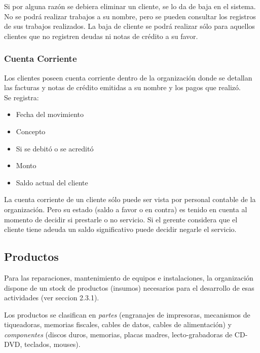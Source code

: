 \documentclass[12pt]{extarticle}
\begin{document}
\begin{spacing}{1.2}
    Si por alguna razón se debiera eliminar un cliente, se lo da de baja en el sistema. No se podrá realizar trabajos a su nombre, pero se pueden consultar los registros de sus trabajos realizados. La baja de cliente se podrá realizar sólo para aquellos clientes que no registren deudas ni notas de crédito a su favor.
    
    \subsubsection{Cuenta Corriente}
        Los clientes poseen cuenta corriente dentro de la organización donde se detallan las facturas y notas de crédito emitidas a su nombre y los pagos que realizó.\\
        Se registra:
        \begin{itemize}
            \item Fecha del movimiento
            \item Concepto
            \item Si se debitó o se acreditó
            \item Monto
            \item Saldo actual del cliente
        \end{itemize}

        La cuenta corriente de un cliente sólo puede ser vista por personal contable de la organización. Pero su estado (saldo a favor o en contra) es tenido en cuenta al momento de decidir si prestarle o no servicio. Si el gerente considera que el cliente tiene adeuda un saldo significativo puede decidir negarle el servicio.


    \pagebreak
    \subsection{Productos}
    
        Para las reparaciones, mantenimiento de equipos e instalaciones, la organización dispone de un stock de productos (insumos) necesarios para el desarrollo de esas actividades (ver seccion 2.3.1).
    
        Los productos se clasifican en \textit{partes} (engranajes de impresoras, mecanismos de tiqueadoras, memorias fiscales, cables de datos, cables de alimentación) y \textit{componentes} (discos duros, memorias, placas madres, lecto-grabadoras de CD-DVD, teclados, mouses).\\


\end{spacing}
\end{document}
